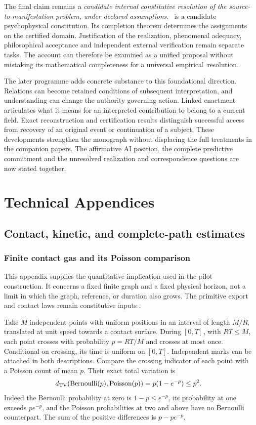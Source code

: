 The final claim remains a \emph{candidate internal constitutive resolution of the source-to-manifestation problem, under declared assumptions}. \spctwo\ is a candidate psychophysical constitution. Its completion theorem determines the assignments on the certified domain. Justification of the realization, phenomenal adequacy, philosophical acceptance and independent external verification remain separate tasks. The account can therefore be examined as a unified proposal without mistaking its mathematical completeness for a universal empirical~resolution.


The later programme adds concrete substance to this foundational direction. Relations can become retained conditions of subsequent interpretation, and understanding can change the authority governing action. Linked enactment articulates what it means for an interpreted contribution to belong to a current field. Exact reconstruction and certification results distinguish successful access from recovery of an original event or continuation of a subject. These developments strengthen the monograph without displacing the full treatments in the companion papers. The affirmative AI position, the complete predictive commitment and the unresolved realization and correspondence questions are now stated together.

\appendix
\part*{Technical Appendices}
\chapter{Contact, kinetic, and complete-path estimates}\label{app:kinetic}
\section{Finite contact gas and its Poisson comparison}\label{section:kinetic:finite-contact-gas-and-its-poisson-comparison}
This appendix supplies the quantitative implication used in the pilot construction. It concerns a fixed finite graph and a fixed physical horizon, not a limit in which the graph, reference, or duration also grows. The primitive export and contact laws remain constitutive inputs \cite{RodgersPilot,RodgersMeasurement}.

Take $M$ independent points with uniform positions in an interval of length $M/R$, translated at unit speed towards a contact surface. During $[0,T]$, with $RT\le M$, each point crosses with probability $p=RT/M$ and crosses at most once. Conditional on crossing, its time is uniform on $[0,T]$. Independent marks can be attached in both descriptions. Compare the crossing indicator of each point with a Poisson count of mean $p$. Their exact total variation is
\[
d_{\mathrm{TV}}(\operatorname{Bernoulli}(p),\operatorname{Poisson}(p))
=p(1-e^{-p})\le p^2.
\]
Indeed the Bernoulli probability at zero is $1-p\le e^{-p}$, its probability at one exceeds $pe^{-p}$, and the Poisson probabilities at two and above have no Bernoulli counterpart. The sum of the positive differences is $p-pe^{-p}$.


